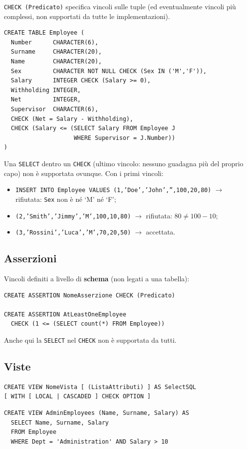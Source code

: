\documentclass[a4paper,12pt]{article}
\begin{document}
\texttt{CHECK (Predicato)} specifica vincoli sulle tuple (ed eventualmente
vincoli più complessi, non supportati da tutte le implementazioni).
\begin{verbatim}
CREATE TABLE Employee (
  Number      CHARACTER(6),
  Surname     CHARACTER(20),
  Name        CHARACTER(20),
  Sex         CHARACTER NOT NULL CHECK (Sex IN ('M','F')),
  Salary      INTEGER CHECK (Salary >= 0),
  Withholding INTEGER,
  Net         INTEGER,
  Supervisor  CHARACTER(6),
  CHECK (Net = Salary - Withholding),
  CHECK (Salary <= (SELECT Salary FROM Employee J
                    WHERE Supervisor = J.Number))
)
\end{verbatim}
Una \texttt{SELECT} dentro un \texttt{CHECK} (ultimo vincolo: nessuno guadagna
più del proprio capo) non è supportata ovunque. Con i primi vincoli:
\begin{itemize}
  \item \texttt{INSERT INTO Employee VALUES (1,'Doe','John','',100,20,80)}
    $\to$ rifiutata: \texttt{Sex} non è né `M' né `F';
  \item \texttt{(2,'Smith','Jimmy','M',100,10,80)} $\to$ rifiutata: $80 \neq
    100-10$;
  \item \texttt{(3,'Rossini','Luca','M',70,20,50)} $\to$ accettata.
\end{itemize}

\subsection{Asserzioni}

Vincoli definiti a livello di \textbf{schema} (non legati a una tabella):
\begin{verbatim}
CREATE ASSERTION NomeAsserzione CHECK (Predicato)

CREATE ASSERTION AtLeastOneEmployee
  CHECK (1 <= (SELECT count(*) FROM Employee))
\end{verbatim}
Anche qui la \texttt{SELECT} nel \texttt{CHECK} non è supportata da tutti.

\subsection{Viste}

\begin{verbatim}
CREATE VIEW NomeVista [ (ListaAttributi) ] AS SelectSQL
[ WITH [ LOCAL | CASCADED ] CHECK OPTION ]
\end{verbatim}
\begin{verbatim}
CREATE VIEW AdminEmployees (Name, Surname, Salary) AS
  SELECT Name, Surname, Salary
  FROM Employee
  WHERE Dept = 'Administration' AND Salary > 10
\end{verbatim}
\end{document}
